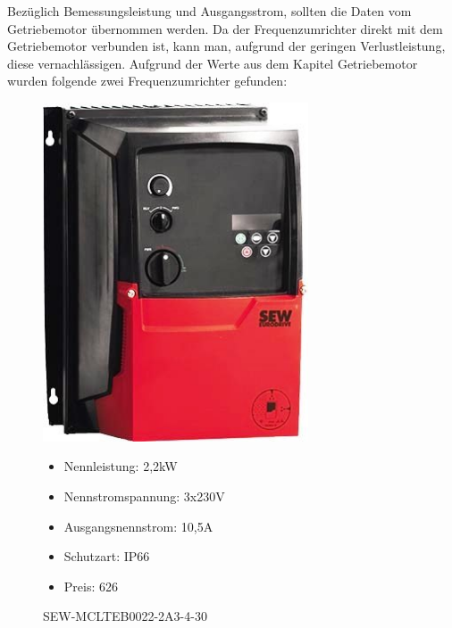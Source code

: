 \documentclass[12pt]{scrreprt} %
\begin{document}
Bezüglich Bemessungsleistung und Ausgangsstrom, sollten die Daten vom Getriebemotor übernommen werden. Da der Frequenzumrichter direkt mit dem Getriebemotor verbunden ist, kann man, aufgrund der geringen Verlustleistung, diese vernachlässigen. Aufgrund der Werte aus dem Kapitel Getriebemotor wurden folgende zwei Frequenzumrichter gefunden:

\begin{figure}
\begin{minipage}[t]{0.45\textwidth}
\includegraphics[width=0.70\textwidth]{SEWFU}
\caption{SEW-MCLTEB0022-2A3-4-30}

\begin{itemize}
	\item{Nennleistung: 2,2kW}
	\item{Nennstromspannung: 3x230V}
	\item{Ausgangsnennstrom: 10,5A}
	\item{Schutzart: IP66}
	\item{Preis: 626\textsf{\texteuro}}
\end{itemize}

\end{minipage}
\hspace{0.1\textwidth}
\begin{minipage}[t]{0.45\textwidth}


\end{minipage}
\end{figure}
\end{document}
